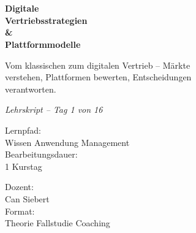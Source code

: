 \documentclass[11pt,a4paper,oneside]{article}
\newcommand{\caveatfontfallback}{\itshape}
\newcommand\caveatfont{\caveatfontfallback}%
\begin{document}
\begin{titlepage}
  \pagestyle{empty}
  \vspace*{1.5cm}
  \\[2pt]
  \noindent{\color{lpAccent}\rule{\linewidth}{1.2pt}}\\[4pt]

  \vspace{3cm}
  {\sffamily\fontsize{30}{34}\selectfont\bfseries\color{lpInk}Digitale\\Vertriebsstrategien\\\&\\Plattformmodelle\par}

  \vspace{0.7cm}
  {\sffamily\large\color{lpGray}Vom klassischen zum digitalen Vertrieb -- Märkte\\verstehen, Plattformen bewerten, Entscheidungen\\verantworten.\par}

  \vspace{1.5cm}
  {\caveatfont\LARGE\color{lpAmber}Lehrskript -- Tag 1 von 16}\par

  \vfill

  \noindent\begin{minipage}{0.55\linewidth}
    {\sffamily\footnotesize\color{lpGray}Lernpfad:}\\
    {\sffamily\small\color{lpInk}Wissen \textrightarrow{} Anwendung \textrightarrow{} Management}\\[10pt]
    {\sffamily\footnotesize\color{lpGray}Bearbeitungsdauer:}\\
    {\sffamily\small\color{lpInk}1 Kurstag}
  \end{minipage}\hfill
  \begin{minipage}{0.4\linewidth}
    \raggedleft
    {\sffamily\footnotesize\color{lpGray}Dozent:}\\
    {\sffamily\small\color{lpInk}Can Siebert}\\[10pt]
    {\sffamily\footnotesize\color{lpGray}Format:}\\
    {\sffamily\small\color{lpInk}Theorie \textperiodcentered{} Fallstudie \textperiodcentered{} Coaching}
  \end{minipage}

  \vspace{0.5cm}
  \noindent{\color{lpAccent}\rule{\linewidth}{0.6pt}}
\end{titlepage}
\end{document}
